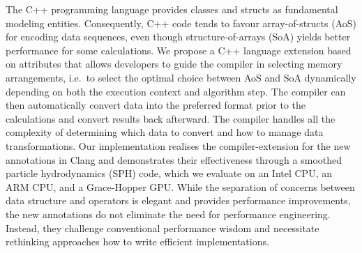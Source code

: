 The C++ programming language provides classes and structs as fundamental modeling entities. 
Consequently, C++ code tends to favour array-of-structs (AoS) for encoding data sequences, even though
structure-of-arrays (SoA) yields better performance for some calculations. 
We propose a C++ language extension based on attributes that allows developers to guide the compiler in selecting memory arrangements, i.e.~to select the optimal choice between AoS and SoA dynamically depending on both the execution context and algorithm step.
The compiler can then automatically convert data into the preferred format prior to the calculations and convert results back afterward. 
The compiler handles all the complexity of determining which data to convert and how to manage data transformations.
Our implementation realises the compiler-extension for the new annotations in Clang and demonstrates their effectiveness through a smoothed particle hydrodynamics (SPH) code, which we evaluate on an Intel CPU, an ARM CPU, and a Grace-Hopper GPU. 
While the separation of concerns between data structure and operators is elegant and provides performance improvements, the new annotations do not eliminate the need for performance engineering. 
Instead, they challenge conventional performance wisdom and necessitate rethinking approaches how to write efficient implementations.
